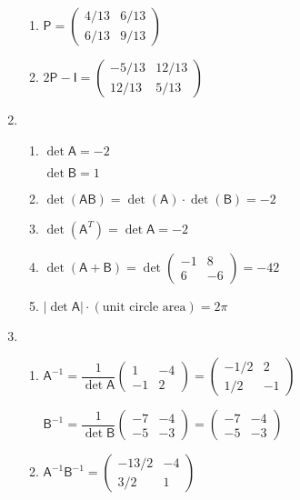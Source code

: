 \begin{enumerate}
\begin{enumerate}
\item $\mathsf{P} = \begin{pmatrix} 4/13 & 6/13 \\ 6/13 & 9/13 \end{pmatrix}$
\item $2\mathsf{P} - \mathsf{I} = \begin{pmatrix} -5/13 & 12/13 \\ 12/13 & 5/13 \end{pmatrix}$
\end{enumerate}
\item \begin{enumerate}
\item $\det\mathsf{A} = -2$\par 
$\det\mathsf{B} = 1$
\item $\det(\mathsf{AB}) = \det(\mathsf{A})\cdot\det(\mathsf{B}) = -2$
\item $\det(\mathsf{A}^T) = \det\mathsf{A} = -2$
\item $\det(\mathsf{A} + \mathsf{B}) = \det\begin{pmatrix} -1 & 8 \\ 6 & -6 \end{pmatrix} = -42$
\item $\lvert\det\mathsf{A}\rvert\cdot(\text{unit circle area}) = 2\pi$
\end{enumerate}
\item \begin{enumerate}
\item $\mathsf{A}^{-1} = \dfrac{1}{\det\mathsf{A}}\begin{pmatrix} 1 & -4 \\ -1 & 2 \end{pmatrix} = \begin{pmatrix} -1/2 & 2 \\ 1/2 & -1 \end{pmatrix}$\par
$\mathsf{B}^{-1} = \dfrac{1}{\det\mathsf{B}}\begin{pmatrix} -7 & -4 \\ -5 & -3 \end{pmatrix} = \begin{pmatrix} -7 & -4 \\ -5 & -3 \end{pmatrix}$
\item $\mathsf{A}^{-1}\mathsf{B}^{-1} = \begin{pmatrix} -13/2 & -4 \\ 3/2 & 1 \end{pmatrix}$\par

\end{enumerate}
\end{enumerate}
